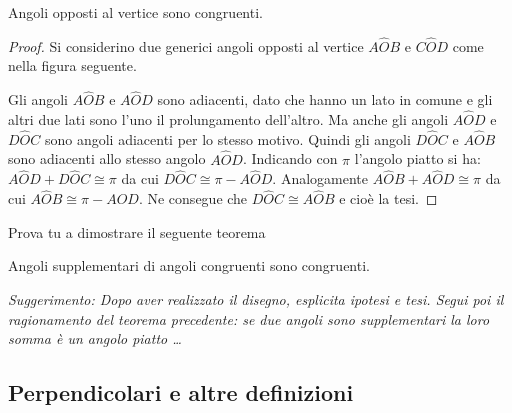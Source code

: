 \begin{inaccessibleblock}
 \begin{figure}[htb]
\centering
\end{figure}
\end{inaccessibleblock}

\begin{teorema}
Angoli opposti al vertice sono congruenti.
\end{teorema}

\begin{proof}
Si considerino due generici angoli opposti al vertice \(A\widehat{O}B\) 
e \(C\widehat{O}D\) come nella figura seguente.

\begin{inaccessibleblock}
 \begin{figure}[htb]
\centering
\end{figure}
\end{inaccessibleblock}
Gli angoli \(A\widehat{O}B\) e \(A\widehat{O}D\) sono adiacenti, dato che 
hanno un lato in comune e gli altri due lati sono l'uno il 
prolungamento dell'altro. Ma anche gli angoli \(A\widehat{O}D\) e 
\(D\widehat{O}C\) sono angoli adiacenti per lo stesso motivo. Quindi 
gli angoli \(D\widehat{O}C\) e \(A\widehat{O}B\) sono adiacenti allo 
stesso angolo \(A\widehat{O}D\).
Indicando con \(\pi\) l'angolo piatto si ha: \(A\widehat{O}D + 
D\widehat{O}C \cong \pi\) da cui \(D\widehat{O}C\cong \pi - 
A\widehat{O}D\). Analogamente \(A\widehat{O}B+A\widehat{O}D\cong\pi\) da 
cui \(A\widehat{O}B\cong \pi-A\widehat{O}D\). Ne consegue che 
\(D\widehat{O}C\cong A\widehat{O}B\) e cioè la tesi.
\end{proof}

Prova tu a dimostrare il seguente teorema

\begin{teorema}
Angoli supplementari di angoli congruenti sono congruenti.
\end{teorema}

\emph{Suggerimento: Dopo aver realizzato il disegno, esplicita 
ipotesi e tesi. Segui poi il ragionamento del teorema precedente: se 
due angoli sono supplementari la loro somma è un angolo piatto 
\ldots{}}

\subsection{Perpendicolari e altre definizioni}

